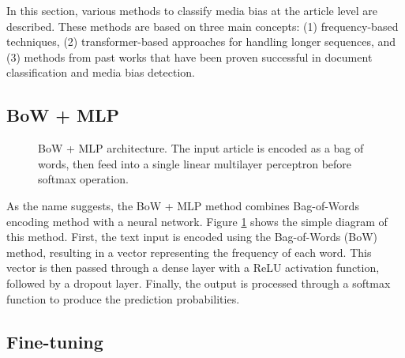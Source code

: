 In this section, various methods to classify media bias at the article level are described. These methods are based on three main concepts: (1) frequency-based techniques, (2) transformer-based approaches for handling longer sequences, and (3) methods from past works that have been proven successful in document classification and media bias detection.


\subsection{BoW + MLP}

\begin{figure}[htbp]
    \centering
    \caption{BoW + MLP architecture. The input article is encoded as a bag of words, then feed into a single linear multilayer perceptron before softmax operation.}
    \label{fig:bow_mlp_architecture}
\end{figure}

As the name suggests, the BoW + MLP method combines Bag-of-Words encoding method with a neural network. Figure \ref{fig:bow_mlp_architecture} shows the simple diagram of this method. First, the text input is encoded using the Bag-of-Words (BoW) method, resulting in a vector representing the frequency of each word. This vector is then passed through a dense layer with a ReLU activation function, followed by a dropout layer. Finally, the output is processed through a softmax function to produce the prediction probabilities.

\subsection{Fine-tuning}

